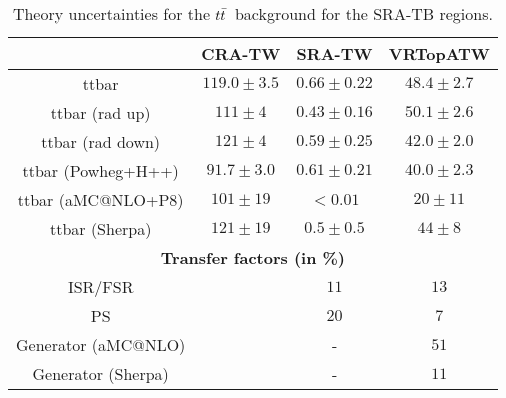 \begin{description}
  \begin{table}[!h]
    \begin{center} \footnotesize
      \begin{tabular}{|c|c|c|c|}
        \hline
        & CRA-TW & SRA-TW & VRTopATW\\
        \hline
        ttbar&   $119.0\pm 3.5 $&        $0.66\pm 0.22 $&        $48.4\pm 2.7 $\\
        ttbar (rad up)&          $111\pm 4 $&    $0.43\pm 0.16 $&        $50.1\pm 2.6 $\\
        ttbar (rad down)&        $121\pm 4 $&    $0.59\pm 0.25 $&        $42.0\pm 2.0 $\\
        ttbar (Powheg+H++)&      $91.7\pm 3.0 $&         $0.61\pm 0.21 $&        $40.0\pm 2.3 $\\
        ttbar (aMC@NLO+P8)&      $101\pm 19 $&   $<0.01$&        $20\pm 11 $\\
        ttbar (Sherpa)&          $121\pm 19 $&   $0.5\pm 0.5 $&          $44\pm 8 $\\
        \hline
        \multicolumn{4}{c}{\bf Transfer factors (in \%)} \\ \hline
        ISR/FSR &      &  $11$&   $13$\\
        PS &  &      $20$&   $7$\\
        Generator (aMC@NLO) & & - & $51$\\
        Generator (Sherpa) & & - & $11$\\
        \hline
        \end{tabular}
    \end{center}
    \caption{Theory uncertainties for the $t\bar{t}$\ background for the SRA-TB regions.}
    \label{tab:ttbar_unc_SRA_TW}
  \end{table}


\end{description}

